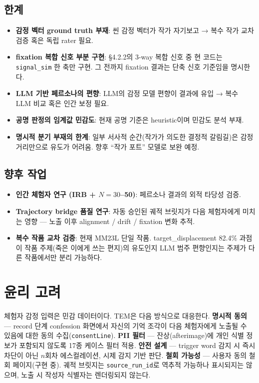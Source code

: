 \documentclass[11pt, a4paper]{article}
\begin{document}
\subsection{한계}
\begin{itemize}
  \item \textbf{감정 벡터 ground truth 부재}: 씬 감정 벡터가 작가 자기보고 → 복수 작가 교차 검증 혹은 독립 rater 필요.
  \item \textbf{fixation 복합 신호 부분 구현}: \S4.2.2의 3-way 복합 신호 중 현 코드는 \texttt{signal\_sim} 한 축만 구현. 그 전까지 fixation 결과는 단축 신호 기준임을 명시한다.
  \item \textbf{LLM 기반 페르소나의 편향}: LLM의 감정 모델 편향이 결과에 유입 → 복수 LLM 비교 혹은 인간 보정 필요.
  \item \textbf{공명 판정의 임계값 민감도}: 현재 공명 기준은 heuristic이며 민감도 분석 부재.
  \item \textbf{명시적 분기 부재의 한계}: 일부 서사적 순간(작가가 의도한 결정적 갈림길)은 감정 거리만으로 유도가 어려움. 향후 ``작가 포트'' 모델로 보완 예정.
\end{itemize}

\subsection{향후 작업}
\begin{itemize}
  \item \textbf{인간 체험자 연구 (IRB + $N=30$--50)}: 페르소나 결과의 외적 타당성 검증.
  \item \textbf{Trajectory bridge 품질 연구}: 자동 승인된 궤적 브릿지가 다음 체험자에게 미치는 영향 --- 노출 이후 alignment / drift / fixation 변화 추적.
  \item \textbf{복수 작품 교차 검증}: 현재 MM23L 단일 작품. target\_displacement 82.4\% 과점이 작품 주제(죽은 이에게 쓰는 편지)의 유도인지 LLM 범주 편향인지는 주제가 다른 작품에서만 분리 가능하다.
\end{itemize}

\section{윤리 고려}
체험자 감정 입력은 민감 데이터이다. TEM은 다음 방식으로 대응한다. \textbf{명시적 동의} --- record 단계 confession 화면에서 자신의 기억 조각이 다음 체험자에게 노출될 수 있음에 대한 동의 수집(\texttt{consentLine}). \textbf{PII 필터} --- 잔상(afterimage)에 개인 식별 정보가 포함되지 않도록 17종 케이스 필터 적용. \textbf{안전 설계} --- trigger word 감지 시 즉시 차단이 아닌 $n$회차 에스컬레이션, 시제 감지 기반 판단. \textbf{철회 가능성} --- 사용자 동의 철회 페이지(구현 중). 궤적 브릿지는 \texttt{source\_run\_id}로 역추적 가능하나 표시되지는 않으며, 노출 시 작성자 식별자는 렌더링되지 않는다.
\end{document}
